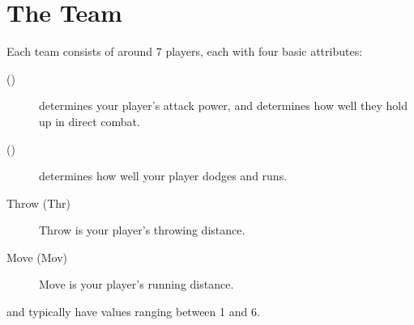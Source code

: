 \section{The Team} \label{the-team}
Each team consists of around 7 players, each with four basic attributes:

\begin{description}
    \item[\fight{} (\fgt{})] \fight{} determines your player's attack power, and determines how well they hold up in direct combat.
    \item[\flight{} (\flt{})] \flight{} determines how well your player dodges and runs.
    \item[Throw (Thr)] Throw is your player's throwing distance.
    \item[Move (Mov)] Move is your player's running distance.
\end{description}

\fight{} and \flight{} typically have values ranging between 1 and 6.



